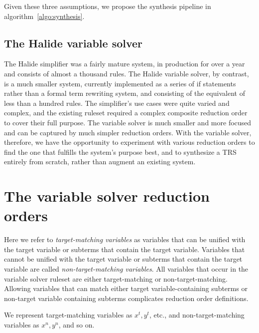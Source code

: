 Given these three assumptions, we propose the synthesis pipeline in algorithm~\ref{algo:synthesis}. 

\subsection{The Halide variable solver}

The Halide simplifier was a fairly mature system, in production for over a year and consists of almost a thousand rules. The Halide variable solver, by contrast, is a much smaller system, currently implemented as a series of if statements rather than a formal term rewriting system, and consisting of the equivalent of less than a hundred rules. The simplifier's use cases were quite varied and complex, and the existing ruleset required a complex composite reduction order to cover their full purpose. The variable solver is much smaller and more focused and can be captured by much simpler reduction orders. With the variable solver, therefore, we have the opportunity to experiment with various reduction orders to find the one that fulfills the system's purpose best, and to synthesize a TRS entirely from scratch, rather than augment an existing system.


\section{The variable solver reduction orders}

Here we refer to \emph{target-matching variables} as variables that can be unified with the target variable or subterms that contain the target variable. Variables that cannot be unified with the target variable or subterms that contain the target variable are called \emph{non-target-matching variables}. All variables that occur in the variable solver ruleset are either target-matching or non-target-matching. Allowing variables that can match either target variable-containing subterms or non-target variable containing subterms complicates reduction order definitions. 

We represent target-matching variables as $x^t, y^t$, etc., and non-target-matching variables as $x^n, y^n$, and so on.


